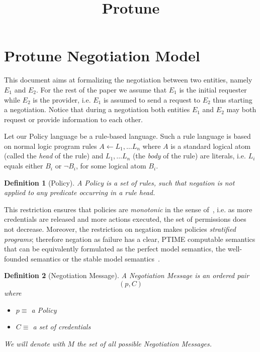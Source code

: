 \documentclass{article}
\title{Protune}
\newtheorem{definition}{Definition} %
\begin{document}
\maketitle

\section{Protune Negotiation Model}

This document aims at formalizing the negotiation between two entities, namely $E_1$ and $E_2$. For the rest of the paper we assume that $E_1$ is the initial requester while $E_2$ is the provider, i.e. $E_1$ is assumed to send a request to $E_2$ thus starting a negotiation. Notice that during a negotiation both entities $E_1$ and $E_2$ may both request or provide information to each other.

Let our Policy language be a rule-based language. Such a rule language is based on normal logic program rules $ A \leftarrow L_{1}, \ldots L_{n}$ where $A$ is a standard logical atom (called the \textit{head} of the rule) and $L_1, \ldots L_n$ (the \textit{body} of the rule) are literals, i.e. $L_{i}$ equals either $B_{i}$ or $\neg B_{i}$, for some logical atom $B_{i}$.

\begin{definition}[Policy]
A Policy is a set of rules, such that negation is not applied to any predicate occurring in a rule head.
\end{definition}

This restriction ensures that policies are \emph{monotonic} in the sense of~\cite{swyyj02}, i.e. as more credentials are released and more actions executed, the set of permissions does not decrease. Moreover, the restriction on negation makes policies \textit{stratified programs}; therefore negation as failure has a clear, PTIME computable semantics that can be equivalently formulated as the perfect model semantics, the well-founded semantics or the stable model semantics~\cite{baral-book}.

\begin{definition}[Negotiation Message]
A Negotiation Message is an ordered pair
$$(p, C)$$
where
  \begin{itemize}
	\item $p \equiv$ a Policy
	\item $C \equiv$ a set of credentials
  \end{itemize}
We will denote with $M$ the set of all possible Negotiation Messages.
\end{definition}
\end{document}
